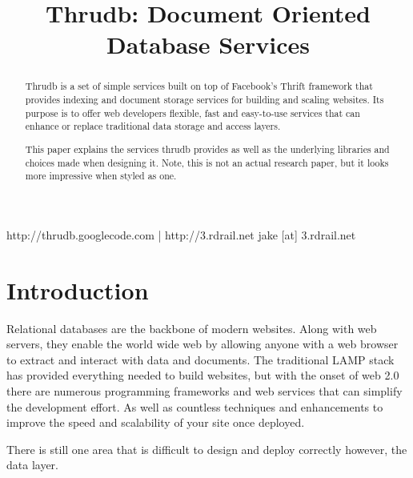 \documentclass[nocopyrightspace,blockstyle]{sigplanconf}
\begin{document}


\title{Thrudb: Document Oriented Database Services}
\subtitle{}

           {http://thrudb.googlecode.com | http://3.rdrail.net}
           {jake [at] 3.rdrail.net}
\maketitle

\begin{abstract}
Thrudb is a set of simple services built on top of Facebook's Thrift framework that provides
indexing and document storage services for building and scaling websites.
Its purpose is to offer web developers flexible, fast and easy-to-use services that can
enhance or replace traditional data storage and access layers.

This paper explains the services thrudb provides as well as the underlying libraries and choices
made when designing it.  Note, this is not an actual research paper, but it looks more impressive
when styled as one.
\end{abstract}




\section{Introduction}
Relational databases are the backbone of modern websites.  Along with web servers, they enable the
world wide web by allowing anyone with a web browser to extract and interact with data and documents.
The traditional LAMP stack has provided everything needed to build websites, but with the onset of web 2.0
there are numerous programming frameworks and web services that can simplify the development effort.
As well as countless techniques and enhancements to improve the speed and scalability of your site once deployed.

There is still one area that is difficult to design and deploy correctly however, the data layer.
\end{document}
